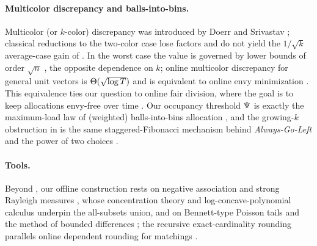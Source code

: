 \paragraph{Multicolor discrepancy and balls-into-bins.}
Multicolor (or $k$-color) discrepancy was introduced by Doerr and Srivastav \cite{DoerrSrivastav2003}; classical reductions to
the two-color case lose factors and do not yield the $1/\sqrt k$ average-case gain of . In the worst case the
value is governed by lower bounds of order $\sqrt n$ \cite{MulticolorLB2025}, the opposite dependence on $k$; online multicolor
discrepancy for general unit vectors is $\Theta(\sqrt{\log T})$ and is equivalent to online envy minimization \cite{HPVX2025}.
This equivalence ties our question to online fair division, where the goal is to keep allocations envy-free over time
\cite{LiptonMarkakisMosselSaberi2004,BenadeKPP2018,Caragiannis2019}. Our occupancy threshold $\Psi$ is exactly the
maximum-load law of (weighted) balls-into-bins allocation
\cite{ABKU1999,BCSV2006,RaabSteger1998,TalwarWieder2007,Gonnet1981,KolchinSevastyanovChistyakov1978}, and the growing-$k$
obstruction in  is the same staggered-Fibonacci mechanism behind \emph{Always-Go-Left} and the power of two
choices \cite{Vocking2003,MitzenmacherUpfal2017,Mitzenmacher2001,PeresTalwarWieder2015}.

\paragraph{Tools.}
Beyond \cite{LovettMeka2015}, our offline construction rests on negative association and strong Rayleigh measures
\cite{JoagDevProschan1983,DubhashiRanjan1998,Pemantle2000,BorceaBrandenLiggett2009,BrandenHuh2020}, whose concentration theory
\cite{PemantlePeres2014} and log-concave-polynomial calculus \cite{AnariOveisGharanVinzant2018} underpin the all-subsets
union, and on Bennett-type Poisson tails and the method of bounded differences
\cite{Bennett1962,BoucheronLugosiMassart2013,McDiarmid1989,Janson2004,Vershynin2018,DubhashiPanconesi2009}; the recursive
exact-cardinality rounding parallels online dependent rounding for matchings \cite{NSW2025}.
